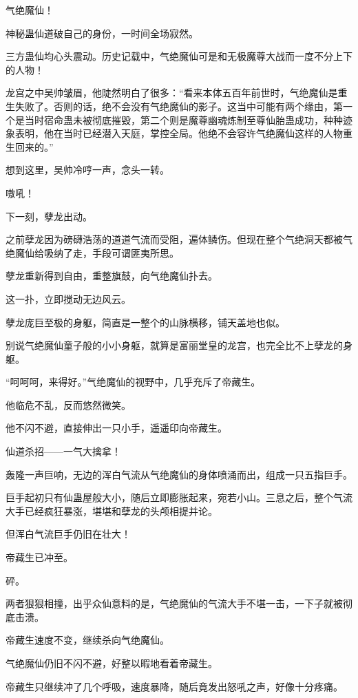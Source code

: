 
\begin{this_body}

气绝魔仙！

神秘蛊仙道破自己的身份，一时间全场寂然。

三方蛊仙均心头震动。历史记载中，气绝魔仙可是和无极魔尊大战而一度不分上下的人物！

龙宫之中吴帅皱眉，他陡然明白了很多：“看来本体五百年前世时，气绝魔仙是重生失败了。否则的话，绝不会没有气绝魔仙的影子。这当中可能有两个缘由，第一个是当时宿命蛊未被彻底摧毁，第二个则是魔尊幽魂炼制至尊仙胎蛊成功，种种迹象表明，他在当时已经潜入天庭，掌控全局。他绝不会容许气绝魔仙这样的人物重生回来的。”

想到这里，吴帅冷哼一声，念头一转。

嗷吼！

下一刻，孽龙出动。

之前孽龙因为磅礴浩荡的道道气流而受阻，遍体鳞伤。但现在整个气绝洞天都被气绝魔仙给吸纳了走，手段可谓匪夷所思。

孽龙重新得到自由，重整旗鼓，向气绝魔仙扑去。

这一扑，立即搅动无边风云。

孽龙庞巨至极的身躯，简直是一整个的山脉横移，铺天盖地也似。

别说气绝魔仙童子般的小小身躯，就算是富丽堂皇的龙宫，也完全比不上孽龙的身躯。

“呵呵呵，来得好。”气绝魔仙的视野中，几乎充斥了帝藏生。

他临危不乱，反而悠然微笑。

他不闪不避，直接伸出一只小手，遥遥印向帝藏生。

仙道杀招——一气大擒拿！

轰隆一声巨响，无边的浑白气流从气绝魔仙的身体喷涌而出，组成一只五指巨手。

巨手起初只有仙蛊屋般大小，随后立即膨胀起来，宛若小山。三息之后，整个气流大手已经疯狂暴涨，堪堪和孽龙的头颅相提并论。

但浑白气流巨手仍旧在壮大！

帝藏生已冲至。

砰。

两者狠狠相撞，出乎众仙意料的是，气绝魔仙的气流大手不堪一击，一下子就被彻底击溃。

帝藏生速度不变，继续杀向气绝魔仙。

气绝魔仙仍旧不闪不避，好整以暇地看着帝藏生。

帝藏生只继续冲了几个呼吸，速度暴降，随后竟发出怒吼之声，好像十分疼痛。


\end{this_body}
